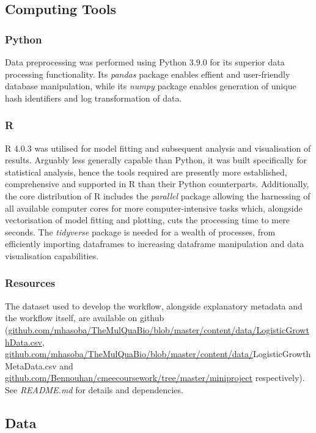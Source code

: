 \documentclass[11pt]{article}
\begin{document}
\subsection{Computing Tools}

\subsubsection{Python}
Data preprocessing was performed using Python 3.9.0 for its superior data processing functionality. Its \textit{pandas} package enables effient and user-friendly database manipulation, while its \textit{numpy} package enables generation of unique hash identifiers and log transformation of data.

\subsubsection{R}
R 4.0.3 was utilised for model fitting and subsequent analysis and visualisation of results. Arguably less generally capable than Python, it was built specifically for statistical analysis, hence the tools required are presently more established, comprehensive and supported in R than their Python counterparts. Additionally, the core distribution of R includes the \textit{parallel} package allowing the harnessing of all available computer cores for more computer-intensive tasks which, alongside vectorisation of model fitting and plotting, cuts the processing time to mere seconds. The \textit{tidyverse} package is needed for a wealth of processes, from efficiently importing dataframes to increasing dataframe manipulation and data visualisation capabilities. 

\subsubsection{Resources}
The dataset used to develop the workflow, alongside explanatory metadata and the workflow itself, are available on github (\url{github.com/mhasoba/TheMulQuaBio/blob/master/content/data/LogisticGrowthData.csv}, \url{github.com/mhasoba/TheMulQuaBio/blob/master/content/data/}LogisticGrowthMetaData.csv and \url{github.com/Bennouhan/cmeecoursework/tree/master/miniproject} respectively). See \textit{README.md} for details and dependencies.


\subsection{Data}
\end{document}
